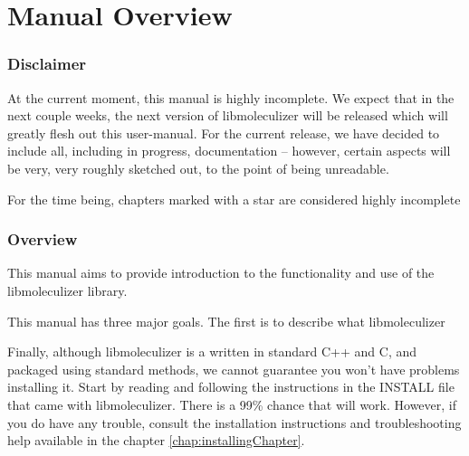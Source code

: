 \section{Manual Overview}

\subsubsection{Disclaimer}
At the current moment, this manual is highly incomplete.  We expect
that in the next couple weeks, the next version of libmoleculizer will
be released which will greatly flesh out this user-manual.  For the
current release, we have decided to include all, including in
progress, documentation -- however, certain aspects will be very, very
roughly sketched out, to the point of being unreadable.  

For the time being, chapters marked with a star are considered highly incomplete

\subsubsection{Overview}

This manual aims to provide introduction to the functionality and use
of the libmoleculizer library.  


This manual has three major goals.  The first is to describe what
libmoleculizer

Finally, although libmoleculizer is a written in standard C++ and C,
and packaged using standard methods, we cannot guarantee you won't
have problems installing it.  Start by reading and following the
instructions in the INSTALL file that came with libmoleculizer.  There
is a 99\% chance that will work.  However, if you do have any trouble,
consult the installation instructions and troubleshooting help
available in the chapter \ref{chap:installingChapter}.

